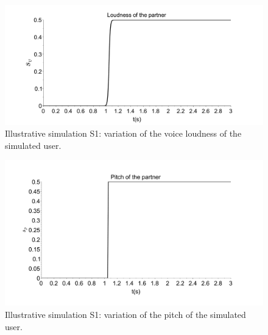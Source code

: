 

\begin{figure}
  \centering
  \includegraphics[width=\linewidth]{figure/loudness_simulated_partner.pdf}
  \caption{Illustrative simulation S1: variation of the voice loudness of the simulated user.}
  \label{fig-volume-user1}
\end{figure}

\begin{figure}%
  \centering
  \includegraphics[width=\linewidth]{figure/Pitch_partenaire.pdf}
  \caption{Illustrative simulation S1: variation of the pitch of the simulated user.}
  \label{fig-pitch-user1}
\end{figure}

